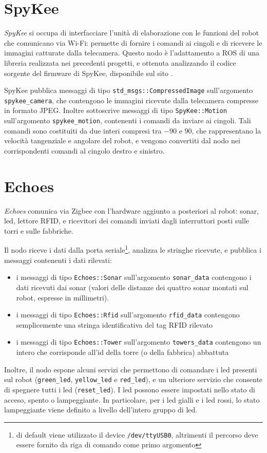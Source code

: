 \section{SpyKee}
\emph{SpyKee} si occupa di interfacciare l'unità di elaborazione con le funzioni del robot che comunicano via Wi-Fi: permette di fornire i comandi ai cingoli e di ricevere le immagini catturate dalla telecamera. Questo nodo è l'adattamento a ROS di una libreria realizzata nei precedenti progetti, e ottenuta analizzando il codice sorgente del firmware di SpyKee, disponibile sul sito \cite{spykee}.

SpyKee pubblica messaggi di tipo \verb|std_msgs::CompressedImage| sull'argomento \verb|spykee_camera|, che contengono le immagini ricevute dalla telecamera compresse in formato JPEG. Inoltre sottoscrive messaggi di tipo \verb|SpyKee::Motion| sull'argomento \verb|spykee_motion|, contenenti i comandi da inviare ai cingoli. Tali comandi sono costituiti da due interi compresi tra $-90$ e $90$, che rappresentano la velocità tangenziale e angolare del robot, e vengono convertiti dal nodo nei corrispondenti comandi al cingolo destro e sinistro.

\section{Echoes}
\emph{Echoes} comunica via Zigbee con l'hardware aggiunto a posteriori al robot: sonar, led, lettore RFID, e ricevitori dei comandi inviati dagli interruttori posti sulle torri e sulle fabbriche.

Il nodo riceve i dati dalla porta seriale\footnote{di default viene utilizzato il device \texttt{/dev/ttyUSB0}, altrimenti il percorso deve essere fornito da riga di comando come primo argomento}, analizza le stringhe ricevute, e pubblica i messaggi contenenti i dati rilevati:
\begin{itemize}
	\item i messaggi di tipo \verb|Echoes::Sonar| sull'argomento \verb|sonar_data| contengono i dati ricevuti dai sonar (valori delle distanze dei quattro sonar montati sul robot, espresse in millimetri).
	\item i messaggi di tipo \verb|Echoes::Rfid| sull'argomento \verb|rfid_data| contengono semplicemente una stringa identificativa del tag RFID rilevato
	\item i messaggi di tipo \verb|Echoes::Tower| sull'argomento \verb|towers_data| contengono un intero che corrisponde all'id della torre (o della fabbrica) abbattuta
\end{itemize}
Inoltre, il nodo espone alcuni servizi che permettono di comandare i led presenti sul robot (\verb|green_led|, \verb|yellow_led| e \verb|red_led|), e un ulteriore servizio che consente di spegnere tutti i led (\verb|reset_led|). I led possono essere impostati nello stato di acceso, spento o lampeggiante. In particolare, per i led gialli e i led rossi, lo stato lampeggiante viene definito a livello dell'intero gruppo di led.

